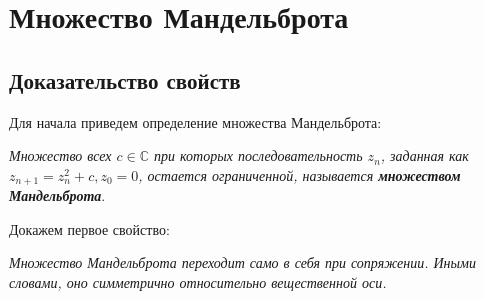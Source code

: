 \section{Множество Мандельброта}

\subsection{Доказательство свойств}

Для начала приведем определение множества Мандельброта:

\begin{definition}
    \textit{Множество всех $c \in \mathbb{C}$ при которых последовательность $z_n$, заданная как $z_{n+1}=z_n^2+c, z_0=0$, остается ограниченной, называется \textbf{множеством Мандельброта}}.
\end{definition}

\noindent Докажем первое свойство:

\begin{property}
    \textit{Множество Мандельброта переходит само в себя при сопряжении. Иными словами, оно симметрично относительно вещественной оси.}
\end{property}

